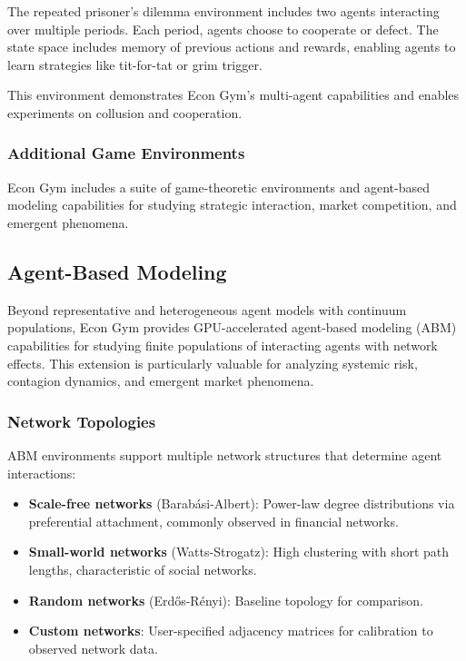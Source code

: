 \documentclass[12pt]{article}
\begin{document}
The repeated prisoner's dilemma environment includes two agents interacting over multiple periods. Each period, agents choose to cooperate or defect. The state space includes memory of previous actions and rewards, enabling agents to learn strategies like tit-for-tat or grim trigger.

This environment demonstrates Econ Gym's multi-agent capabilities and enables experiments on collusion and cooperation.

\subsubsection{Additional Game Environments}

Econ Gym includes a suite of game-theoretic environments and agent-based modeling capabilities for studying strategic interaction, market competition, and emergent phenomena.

\subsection{Agent-Based Modeling}

Beyond representative and heterogeneous agent models with continuum populations, Econ Gym provides GPU-accelerated agent-based modeling (ABM) capabilities for studying finite populations of interacting agents with network effects. This extension is particularly valuable for analyzing systemic risk, contagion dynamics, and emergent market phenomena.

\subsubsection{Network Topologies}

ABM environments support multiple network structures that determine agent interactions:
\begin{itemize}
    \item \textbf{Scale-free networks} (Barab\'{a}si-Albert): Power-law degree distributions via preferential attachment, commonly observed in financial networks.
    \item \textbf{Small-world networks} (Watts-Strogatz): High clustering with short path lengths, characteristic of social networks.
    \item \textbf{Random networks} (Erd\H{o}s-R\'{e}nyi): Baseline topology for comparison.
    \item \textbf{Custom networks}: User-specified adjacency matrices for calibration to observed network data.
\end{itemize}
\end{document}
